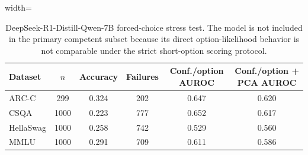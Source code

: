 
\begin{table}[t]
\centering
\small
\caption{DeepSeek-R1-Distill-Qwen-7B forced-choice stress test. The model is not included in the primary competent subset because its direct option-likelihood behavior is not comparable under the strict short-option scoring protocol.}
\label{tab:deepseek-stress}
\begin{adjustbox}{width=\textwidth}
\begin{tabular}{lccccc}
\toprule
Dataset & $n$ & Accuracy & Failures & Conf./option AUROC & Conf./option + PCA AUROC \\
\midrule
ARC-C & 299 & 0.324 & 202 & 0.647 & 0.620 \\
CSQA & 1000 & 0.223 & 777 & 0.652 & 0.617 \\
HellaSwag & 1000 & 0.258 & 742 & 0.529 & 0.560 \\
MMLU & 1000 & 0.291 & 709 & 0.611 & 0.586 \\
\bottomrule
\end{tabular}
\end{adjustbox}
\end{table}
